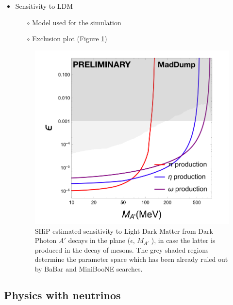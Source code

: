 \begin{itemize}
\begin{itemize}
    
     \end{itemize}
     
    \item Sensitivity to LDM
    \begin{itemize}
        \item[$\circ$] Model used for the simulation
        \item[$\circ$] Exclusion plot (Figure \ref{fig:ldm_sensitivity})
   \end{itemize}
    
     \begin{figure}[htbp]
    \centering  
    \includegraphics[scale=0.3]{figs/PhysicsPerformance/newsens.png}
    \caption{SHiP estimated sensitivity to Light Dark Matter from Dark Photon $A'$ decays in the plane ($\epsilon$, $M_{A'}$ ), in case the latter is produced in the decay of mesons. The grey shaded regions determine the parameter space which has been already ruled out by BaBar and MiniBooNE searches.}
    \label{fig:ldm_sensitivity}
    \end{figure}
    
    
\end{itemize}




\subsection{Physics with neutrinos}

